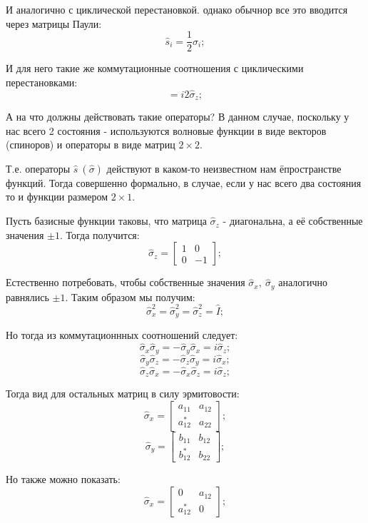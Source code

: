 \documentclass[a4paper, 14pt, russian]{article}
\newcommand{\be}{\begin{equation}}
\newcommand{\ee}{\end{equation}}
\begin{document}
	И аналогично с циклической перестановкой. однако обычнор все это вводится через матрицы Паули:
	\be
		\hat{s}_i = \frac{1}{2} \hat{\sigma}_i;
	\ee

	И для него такие же коммутационные соотношения с циклическими перестановками:
	\be
		[\hat{\sigma}_x;\hat{\sigma}_y] = i 2 \hat{\sigma}_z;
	\ee

	А на что должны действовать такие операторы? В данном случае, поскольку у нас всего 
	2 состояния - используются волновые функции в виде векторов (спиноров) и
	операторы в виде матриц $2 \times 2$.

	Т.е. операторы $\hat{s}~(\hat \sigma)$ действуют в каком-то неизвестном нам 
	ёпространстве функций. Тогда совершенно формально, в случае, если у нас всего два 
	состояния то и функции размером $2 \times 1$.

	Пусть базисные функции таковы, что матрица $\hat{\sigma}_z$ - диагональна, а её
	собственные значения $\pm 1$. Тогда получится:
	\be
		\hat{\sigma}_z = 
			\begin{bmatrix}
				1	&	0\\
				0	&	-1
			\end{bmatrix};
	\ee

	Естественно потребовать, чтобы собственные значения $\hat{\sigma}_x,~\hat{\sigma}_y$
	аналогично равнялись $\pm 1$. Таким образом мы получим:
	\be
		\hat{\sigma}_x^2 = \hat{\sigma}_y^2 = \hat{\sigma}_z^2 = \hat I;
	\ee

	Но тогда из коммутационнных соотношений следует:
	\be
		\hat{\sigma}_x \hat{\sigma}_y = - \hat{\sigma}_y \hat{\sigma}_x = i \hat{\sigma}_z;
	\ee
	\be
		\hat{\sigma}_y \hat{\sigma}_z = - \hat{\sigma}_z \hat{\sigma}_y = i \hat{\sigma}_x;
	\ee
	\be
		\hat{\sigma}_z \hat{\sigma}_x = - \hat{\sigma}_x \hat{\sigma}_z = i \hat{\sigma}_z;
	\ee

	Тогда вид для остальных матриц в силу эрмитовости:
	\be
		\hat{\sigma}_x = 
			\begin{bmatrix}
				a_{11}	&	a_{12}\\
				a_{12}^{*}	&	a_{22}
			\end{bmatrix};
	\ee
	\be
		\hat{\sigma}_y = 
			\begin{bmatrix}
				b_{11}	&	b_{12}\\
				b_{12}^{*}	&	b_{22}
			\end{bmatrix};
	\ee

	Но также можно показать:
	\be
		\hat{\sigma}_x = 
			\begin{bmatrix}
				0	&	a_{12}\\
				a_{12}^{*}	&	0
			\end{bmatrix};
	\ee
\end{document}
